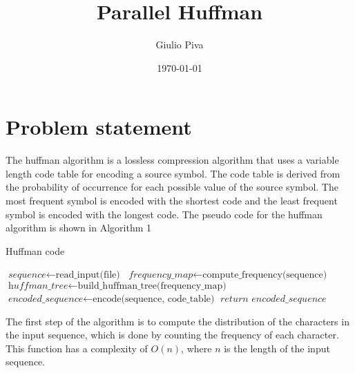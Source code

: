 \documentclass{report}
\title{Parallel Huffman}
\author{Giulio Piva}
\date{\today}
\begin{document}
\maketitle

\tableofcontents

\chapter{Problem statement}
The huffman algorithm is a lossless compression algorithm that uses a variable length code table
for encoding a source symbol. The code table is derived from the probability of occurrence for each
possible value of the source symbol. The most frequent symbol is encoded with the shortest code
and the least frequent symbol is encoded with the longest code.
The pseudo code for the huffman algorithm is shown in Algorithm 1

\begin{algorithm}
    \caption{Huffman code}
    \begin{algorithmic}[1]
        \State $\textit{sequence} \gets \text{read\_input(file)}$
        \State $\textit{frequency\_map} \gets \text{compute\_frequency(sequence)}$
        \State $\textit{huffman\_tree} \gets \text{build\_huffman\_tree(frequency\_map)}$
        \State $\textit{encoded\_sequence} \gets \text{encode(sequence, code\_table)}$
        \State $ \textit{return encoded\_sequence}$
        \EndProcedure
    \end{algorithmic}
\end{algorithm}

The first step of the algorithm is to compute the distribution of the characters in the input sequence,
which is done by counting the frequency of each character. This function has a complexity of $O(n)$,
where $n$ is the length of the input sequence.
\end{document}

